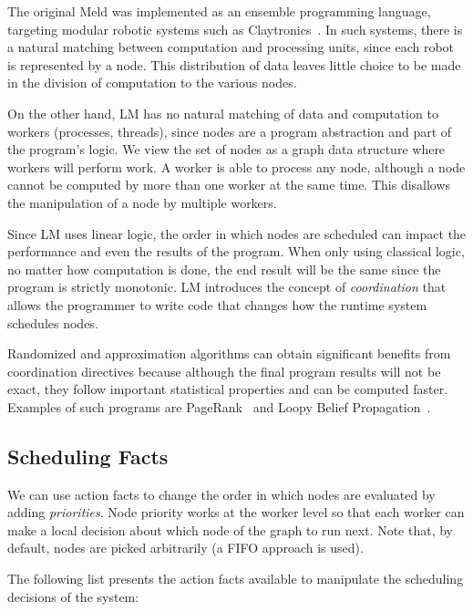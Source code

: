 The original Meld was
implemented as an ensemble programming language, targeting modular robotic systems such as
Claytronics~\cite{ashley-rollman-derosa-iros07wksp}. In such systems, there is a natural matching
between computation and processing units, since each robot is represented by a node. This distribution
of data leaves little choice to be made in the division of computation to the various nodes.

On the other hand, LM has no natural matching of data and computation to workers (processes, threads),
since nodes are a program abstraction and part of the program's logic.
We view the set of nodes as a graph data structure where workers will perform work.
A worker is able to process any node, although a node cannot be computed by more than one worker
at the same time. This disallows the manipulation of a node by multiple workers.

Since LM uses linear logic, the order in which nodes are scheduled can impact the
performance and even the results of the program. When only using
classical logic, no matter how computation is done, the end result will be the same since the program
is strictly monotonic.
LM introduces the concept of \emph{coordination} that allows the programmer
to write code that changes how the runtime system schedules nodes.

Randomized and approximation
algorithms can obtain significant benefits from coordination directives because although the final
program results will not be exact, they follow important statistical properties and can be computed faster.
Examples of such programs are PageRank~\cite{Lubachevsky:1986:CAA:4904.4801} and
Loopy Belief Propagation~\cite{Gonzalez+al:aistats09paraml}.

\subsection{Scheduling Facts}

We can use action facts to change the order in which nodes are evaluated by adding
\emph{priorities}. Node priority works at the worker level
so that each worker can make a local decision about which node of the graph to run next.
Note that, by default, nodes are picked arbitrarily (a FIFO approach is used).

The following list presents the action facts available to manipulate the scheduling decisions of the system:

